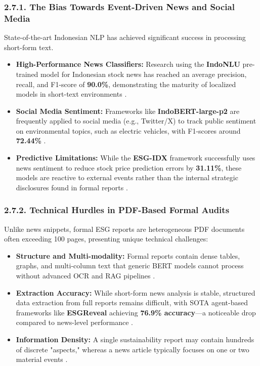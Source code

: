 \documentclass{article}
\begin{document}
\subsubsection*{2.7.1. The Bias Towards Event-Driven News and Social Media}

State-of-the-art Indonesian NLP has achieved significant success in processing short-form text.
\begin{itemize}
\item 

\textbf{High-Performance News Classifiers:} Research using the \textbf{IndoNLU} pre-trained model for Indonesian stock news has reached an average precision, recall, and F1-score of \textbf{90.0\%}, demonstrating the maturity of localized models in short-text environments  \parencite{muhammad_riza_alifi_66b78fb0}.\item 

\textbf{Social Media Sentiment:} Frameworks like \textbf{IndoBERT-large-p2} are frequently applied to social media (e.g., Twitter/X) to track public sentiment on environmental topics, such as electric vehicles, with F1-scores around \textbf{72.44\%}  \parencite[]{adinda_putri_audyna_4121d2b0, christofer_octovianto_487e90aa}.\item 

\textbf{Predictive Limitations:} While the \textbf{ESG-IDX} framework successfully uses news sentiment to reduce stock price prediction errors by \textbf{31.11\%}, these models are reactive to external events rather than the internal strategic disclosures found in formal reports  \parencite{ubaidillah_ariq_prathama_a1856e2f}.
\end{itemize}
\subsubsection*{2.7.2. Technical Hurdles in PDF-Based Formal Audits}

Unlike news snippets, formal ESG reports are heterogeneous PDF documents often exceeding 100 pages, presenting unique technical challenges:
\begin{itemize}
\item 

\textbf{Structure and Multi-modality:} Formal reports contain dense tables, graphs, and multi-column text that generic BERT models cannot process without advanced OCR and RAG pipelines  \parencite{yi_ding_136f177b}.\item 

\textbf{Extraction Accuracy:} While short-form news analysis is stable, structured data extraction from full reports remains difficult, with SOTA agent-based frameworks like \textbf{ESGReveal} achieving \textbf{76.9\% accuracy}—a noticeable drop compared to news-level performance  \parencite{yi_zou_37c055f7}.\item 

\textbf{Information Density:} A single sustainability report may contain hundreds of discrete "aspects," whereas a news article typically focuses on one or two material events  \parencite{blaise_sandwidi_c58b16e0}.
\end{itemize}
\end{document}
